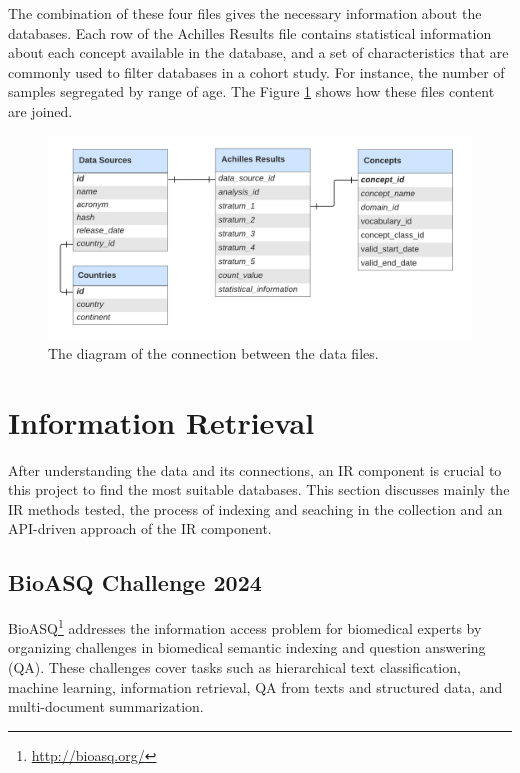 \hspace{1cm}

The combination of these four files gives the necessary information about the databases. Each row of the Achilles Results file contains statistical information about each concept available in the database, and a set of characteristics that are commonly used to filter databases in a cohort study. For instance, the number of samples segregated by range of age. The Figure \ref{fig_data_diagram} shows how these files content are joined.


\begin{figure}[ht]
    \includegraphics[width=1\textwidth]{figs/chapter3/data_diagram.png}
    \centering
    \caption{The diagram of the connection between the data files.}
    \label{fig_data_diagram}
\end{figure}


\section{Information Retrieval}

After understanding the data and its connections, an IR component is crucial to this project to find the most suitable databases. This section discusses mainly the IR methods tested, the process of indexing and seaching in the collection and an API-driven approach of the IR component.



\subsection{BioASQ Challenge 2024}

BioASQ\footnote{\url{http://bioasq.org/}} addresses the information access problem for biomedical experts by organizing challenges in biomedical semantic indexing and question answering (QA). These challenges cover tasks such as hierarchical text classification, machine learning, information retrieval, QA from texts and structured data, and multi-document summarization.

